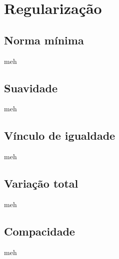 \chapter{Regularização}

\section{Norma mínima}
meh

\section{Suavidade}
meh
\section{Vínculo de igualdade}
meh
\section{Variação total}
meh
\section{Compacidade}
meh
